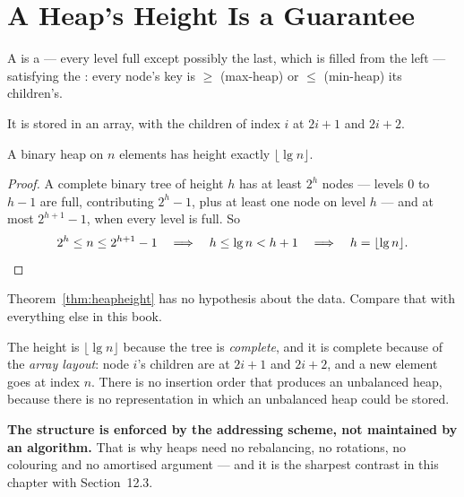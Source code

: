 \section{A Heap's Height Is a Guarantee}

\begin{definitionbox}
A  is a  --- every level full
except possibly the last, which is filled from the left --- satisfying the
: every node's key is $\ge$ (max-heap) or $\le$ (min-heap)
its children's.

\smallskip
It is stored in an array, with the children of index $i$ at $2i+1$ and $2i+2$.
\end{definitionbox}

\begin{theorem}\label{thm:heapheight}
A binary heap on $n$ elements has height exactly $\lfloor \lg n \rfloor$.
\end{theorem}

\begin{proof}
A complete binary tree of height $h$ has at least $2^{h}$ nodes --- levels $0$
to $h-1$ are full, contributing $2^{h}-1$, plus at least one node on level $h$
--- and at most $2^{h+1}-1$, when every level is full. So
\[ 2^{h} \le n \le 2^{h+1}-1 \quad\Longrightarrow\quad
   h \le \lg n < h+1 \quad\Longrightarrow\quad h = \lfloor \lg n \rfloor. \qedhere \]
\end{proof}

\begin{conceptbox}
Theorem~\ref{thm:heapheight} has no hypothesis about the data. Compare that
with everything else in this book.

\smallskip
The height is $\lfloor \lg n \rfloor$ because the tree is \emph{complete}, and
it is complete because of the \emph{array layout}: node $i$'s children are at
$2i+1$ and $2i+2$, and a new element goes at index $n$. There is no insertion
order that produces an unbalanced heap, because there is no representation in
which an unbalanced heap could be stored.

\smallskip
\textbf{The structure is enforced by the addressing scheme, not maintained by
an algorithm.} That is why heaps need no rebalancing, no rotations, no
colouring and no amortised argument --- and it is the sharpest contrast in this
chapter with Section~12.3.
\end{conceptbox}

